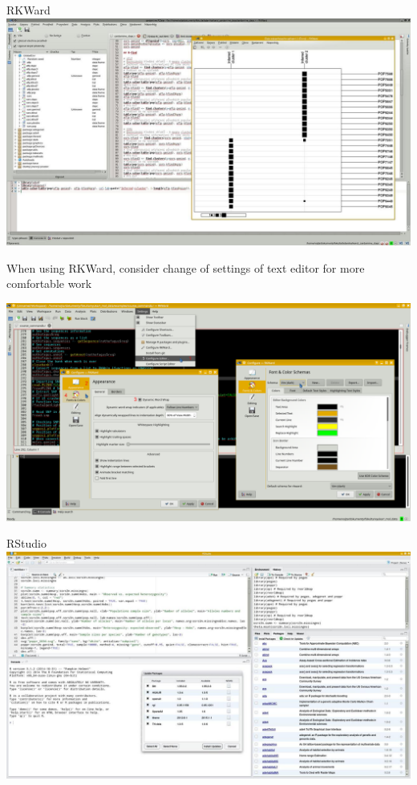 \documentclass[compress, ucs, xelatex, 11pt, xcolor=svgnames,
	hyperref={
		bookmarks=true,
		unicode=true,
		colorlinks=true,
		pdftitle={Molecular data in R},
		plainpages=false,
		pdfauthor={Vojtech Zeisek},
		pdfsubject={Course about phylogeny and evolution in R},
		pdfcreator={XeLaTeX},
		pdfkeywords={R, evolution, phylogeny, molecular data},
		linkcolor=Tomato,
		anchorcolor=SaddleBrown,
		citecolor=Goldenrod,
		filecolor=DarkMagenta,
		menucolor=Sienna,
		urlcolor=DarkTurquoise,
		pdftex},
	url={hyphens, lowtilde} %
	]{beamer}
\begin{document}
\begin{frame}{RKWard}
	\includegraphics[width=\textwidth]{rkward.jpg}
\end{frame}

\begin{frame}{When using RKWard, consider change of settings of text editor for more comfortable work}
	\begin{center}
		\includegraphics[width=\textwidth-0.25cm]{rkward_settings.png}
	\end{center}
\end{frame}

\begin{frame}{RStudio}
	\includegraphics[width=\textwidth]{rstudio.jpg}
\end{frame}
\end{document}
